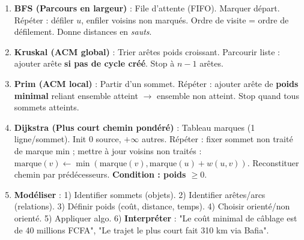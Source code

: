\documentclass[11pt]{article}
\begin{document}
\begin{methode}
\begin{enumerate}
  \item \textbf{BFS (Parcours en largeur)} : File d'attente (FIFO). Marquer départ. Répéter : défiler $u$, enfiler voisins non marqués. Ordre de visite = ordre de défilement. Donne distances en \emph{sauts}.
  \item \textbf{Kruskal (ACM global)} : Trier arêtes poids croissant. Parcourir liste : ajouter arête \textbf{si pas de cycle créé}. Stop à $n-1$ arêtes.
  \item \textbf{Prim (ACM local)} : Partir d'un sommet. Répéter : ajouter arête de \textbf{poids minimal} reliant ensemble atteint $\to$ ensemble non atteint. Stop quand tous sommets atteints.
  \item \textbf{Dijkstra (Plus court chemin pondéré)} : Tableau marques (1 ligne/sommet). Init $0$ source, $+\infty$ autres. Répéter : fixer sommet non traité de marque min ; mettre à jour voisins non traités : $\text{marque}(v) \leftarrow \min(\text{marque}(v), \text{marque}(u)+w(u,v))$. Reconstituer chemin par prédécesseurs. \textbf{Condition : poids $\ge 0$}.
  \item \textbf{Modéliser} : 1) Identifier sommets (objets). 2) Identifier arêtes/arcs (relations). 3) Définir poids (coût, distance, temps). 4) Choisir orienté/non orienté. 5) Appliquer algo. 6) \textbf{Interpréter} : "Le coût minimal de câblage est de 40 millions FCFA", "Le trajet le plus court fait 310 km via Bafia".
\end{enumerate}
\end{methode}
\end{document}
